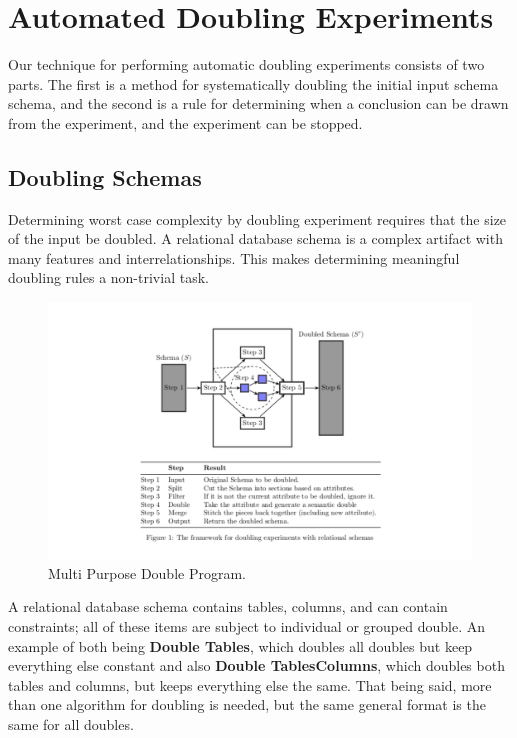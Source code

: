 \section{Automated Doubling Experiments}
  \label{sec:technique}

  Our technique for performing automatic doubling experiments consists
  of two parts.  The first is a method for systematically doubling 
  the initial input schema schema, and the second is a rule for determining
  when a conclusion can be drawn from the experiment, and the experiment can be stopped. 

  \subsection{Doubling Schemas}
  \label{subsec:doubling}

  Determining worst case complexity by doubling experiment requires that
  the size of the input be doubled. A relational database
  schema is a complex artifact with many features and interrelationships. 
  This makes determining meaningful doubling rules a non-trivial task.

  \begin{figure}
    \centering
    \centering
    \includegraphics[width=1.25\linewidth]{../diagrams/genDouble}
    \caption{Multi Purpose Double Program.}
    \label{fig:generaldouble}
  \end{figure}

  A relational database schema contains tables, columns, and can contain constraints; 
  all of these items are subject to individual or grouped double. An example of
  both being \textbf{Double Tables}, which doubles all doubles but keep
  everything else constant and also \textbf{Double TablesColumns}, which
  doubles both tables and columns, but keeps everything else the same. That 
  being said, more than one algorithm for doubling is needed, but the same 
  general format is the same for all doubles.

